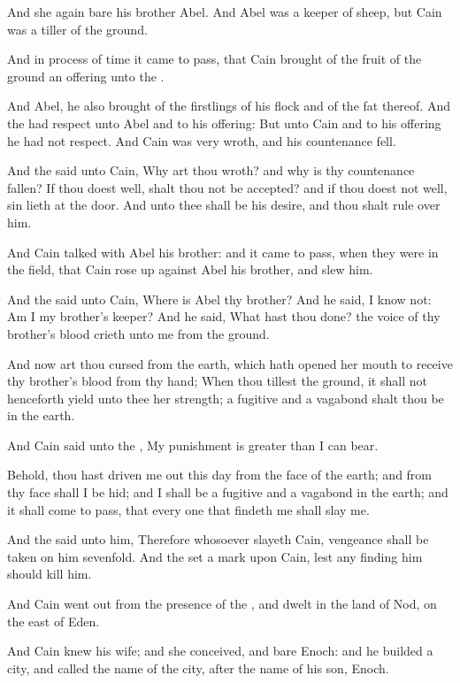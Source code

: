 \verse And she again bare his brother Abel. And Abel was a keeper of sheep, but Cain was a tiller of the ground.

\verse And in process of time it came to pass, that Cain brought of the fruit of the ground an offering unto the \LORD.

\verse And Abel, he also brought of the firstlings of his flock and of the fat thereof. And the \LORD had respect unto Abel and to his offering: \verse But unto Cain and to his offering he had not respect.  And Cain was very wroth, and his countenance fell.

\verse And the \LORD said unto Cain, Why art thou wroth? and why is thy countenance fallen?  \verse If thou doest well, shalt thou not be accepted? and if thou doest not well, sin lieth at the door. And unto thee shall be his desire, and thou shalt rule over him.

\verse And Cain talked with Abel his brother: and it came to pass, when they were in the field, that Cain rose up against Abel his brother, and slew him.

\verse And the \LORD said unto Cain, Where is Abel thy brother? And he said, I know not: Am I my brother's keeper?  \verse And he said, What hast thou done? the voice of thy brother's blood crieth unto me from the ground.

\verse And now art thou cursed from the earth, which hath opened her mouth to receive thy brother's blood from thy hand; \verse When thou tillest the ground, it shall not henceforth yield unto thee her strength; a fugitive and a vagabond shalt thou be in the earth.

\verse And Cain said unto the \LORD, My punishment is greater than I can bear.

\verse Behold, thou hast driven me out this day from the face of the earth; and from thy face shall I be hid; and I shall be a fugitive and a vagabond in the earth; and it shall come to pass, that every one that findeth me shall slay me.

\verse And the \LORD said unto him, Therefore whosoever slayeth Cain, vengeance shall be taken on him sevenfold. And the \LORD set a mark upon Cain, lest any finding him should kill him.

\verse And Cain went out from the presence of the \LORD, and dwelt in the land of Nod, on the east of Eden.

\verse And Cain knew his wife; and she conceived, and bare Enoch: and he builded a city, and called the name of the city, after the name of his son, Enoch.

